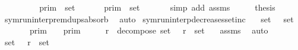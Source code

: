 \begin{isabellebody}
\ \ \isamarkupfalse%
\ \isamarkupfalse%
\ {\isacartoucheopen}{\isasymInter}\ {\isacharparenleft}{\isacharparenleft}{\isasymlambda}{\isasymgamma}{\isachardot}\ {\isasymlbrakk}\ {\isasymgamma}\ {\isasymrbrakk}\isactrlsub p\isactrlsub r\isactrlsub i\isactrlsub m{\isacharparenright}\ {\isacharbackquote}\ set\ {\isasymGamma}{\isacharparenright}\ {\isacharequal}\ {\isasymInter}\ {\isacharparenleft}{\isacharparenleft}{\isasymlambda}{\isasymgamma}{\isachardot}\ {\isasymlbrakk}\ {\isasymgamma}\ {\isasymrbrakk}\isactrlsub p\isactrlsub r\isactrlsub i\isactrlsub m{\isacharparenright}\ {\isacharbackquote}\ set\ {\isasymGamma}{\isacharprime}{\isacharparenright}{\isacartoucheclose}\isanewline
\ \ \ \ \isamarkupfalse%
\ {\isacharparenleft}simp\ add{\isacharcolon}\ assms{\isacharparenright}\isanewline
\ \ \isamarkupfalse%
\ \isamarkupfalse%
\ {\isacharquery}thesis\ \isamarkupfalse%
\ symrun{\isacharunderscore}interp{\isacharunderscore}remdups{\isacharunderscore}absorb\ \isamarkupfalse%
\ auto\isanewline
{}\isamarkupfalse%
%
\endisatagproof
{\isafoldproof}%
%
\isadelimproof
\isanewline
%
\endisadelimproof
\isanewline
{}\isamarkupfalse%
\ symrun{\isacharunderscore}interp{\isacharunderscore}decreases{\isacharunderscore}setinc{\isacharcolon}\isanewline
\ \ \ {\isacartoucheopen}set\ {\isasymGamma}\ {\isasymsubseteq}\ set\ {\isasymGamma}{\isacharprime}{\isacartoucheclose}\isanewline
\ \ \ \ \ {\isacartoucheopen}{\isasymlbrakk}{\isasymlbrakk}\ {\isasymGamma}\ {\isasymrbrakk}{\isasymrbrakk}\isactrlsub p\isactrlsub r\isactrlsub i\isactrlsub m\ {\isasymsupseteq}\ {\isasymlbrakk}{\isasymlbrakk}\ {\isasymGamma}{\isacharprime}\ {\isasymrbrakk}{\isasymrbrakk}\isactrlsub p\isactrlsub r\isactrlsub i\isactrlsub m{\isacartoucheclose}\isanewline
%
\isadelimproof
%
\endisadelimproof
%
\isatagproof
{}\isamarkupfalse%
\ {\isacharminus}\isanewline
\ \ \isamarkupfalse%
\ {\isasymGamma}\isactrlsub r\ \ decompose{\isacharcolon}\ {\isacartoucheopen}set\ {\isacharparenleft}{\isasymGamma}\ {\isacharat}\ {\isasymGamma}\isactrlsub r{\isacharparenright}\ {\isacharequal}\ set\ {\isasymGamma}{\isacharprime}{\isacartoucheclose}\ \isamarkupfalse%
\ assms\ \isamarkupfalse%
\ auto\isanewline
\ \ \isamarkupfalse%
\ {\isacartoucheopen}set\ {\isacharparenleft}{\isasymGamma}\ {\isacharat}\ {\isasymGamma}\isactrlsub r{\isacharparenright}\ {\isacharequal}\ set\ {\isasymGamma}{\isacharprime}{\isacartoucheclose}\ \isamarkupfalse%

\end{isabellebody}
